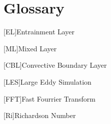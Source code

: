 
\chapter{Glossary}







\begin{acronym}
[EL]{Entrainment Layer}
\end{acronym}

\begin{acronym}
[ML]{Mixed Layer}
\end{acronym}

\begin{acronym}
[CBL]{Convective Boundary Layer}
\end{acronym}

\begin{acronym}
[LES]{Large Eddy Simulation}
\end{acronym}

\begin{acronym}
[FFT]{Fast Fourrier Transform}
\end{acronym}


\begin{acronym}
[Ri]{Richardson Number 
}
\end{acronym}

